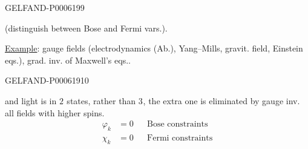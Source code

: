 \begin{GelfandAdjacentEvidence}{GELFAND-P000619}{9}

(distinguish between Bose and Fermi vars.).

\underline{Example}: gauge fields (electrodynamics (Ab.), Yang–Mills,
gravit. field, Einstein eqs.), grad. inv. of Maxwell’s eqs..
\end{GelfandAdjacentEvidence}
\begin{GelfandAdjacentEvidence}{GELFAND-P000619}{10}

and light is in \(2^{\text{}}\) states, rather than \(3^{\text{}}\),
the extra one is eliminated by gauge inv.
\hfill all fields with higher spins.
\[
\begin{aligned}
\varphi_k&=0&&\text{Bose constraints}\\
\chi_k&=0&&\text{Fermi constraints}
\end{aligned}
\]
\end{GelfandAdjacentEvidence}



